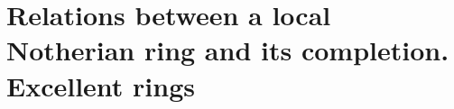 \section{Relations between a local Notherian ring and its completion. Excellent rings}
\label{section:IV.7}

